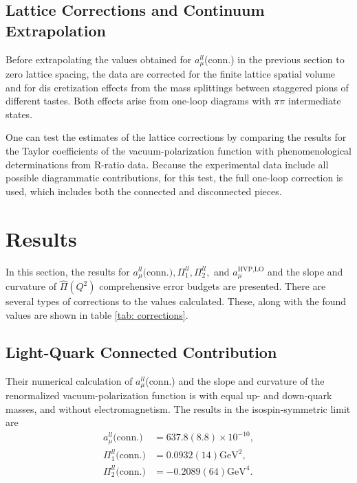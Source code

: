 \documentclass[
a4paper,
10pt,
twoside,
prd,
aps,
nofootinbib,
superscriptaddress,
floatfix,
preprintnumbers,
]{article}
\begin{document}
\subsection{Lattice Corrections and Continuum Extrapolation}
\label{sec: LatCalcC}

Before extrapolating the values obtained for $a_\mu^{ll}$(conn.) in the previous section to zero lattice spacing, the data are corrected for the finite lattice spatial volume and for dis cretization effects from the mass splittings between staggered pions of different tastes.
Both effects arise from one-loop diagrams with $\pi\pi$ intermediate states.

One can test the estimates of the lattice corrections by comparing the results for the Taylor coefficients of the vacuum-polarization function with phenomenological determinations from R-ratio data.
Because the experimental data include all possible diagrammatic contributions, for this test, the full one-loop correction is used, which includes both the connected and disconnected pieces.

\section{Results}
\label{sec: Results}
In this section, the results for $a_\mu^{ll}\text{(conn.)}, \Pi_1^{ll} , \Pi_2^{ll} ,$ and $a_\mu^{\text{HVP,LO}}$ and the slope and curvature of $\hat{\Pi}(Q^2)$ comprehensive error budgets are presented.
There are several types of corrections to the values calculated.
These, along with the found values are shown in table \ref{tab: corrections}.


\subsection{Light-Quark Connected Contribution}

Their numerical calculation of $a_\mu^{ll}$(conn.) and the slope and curvature of the renormalized vacuum-polarization function is with equal up- and down-quark masses, and without electromagnetism.
The results in the isospin-symmetric limit are
\begin{align}
	a_\mu^{ll} \text{(conn.)} &= 637.8(8.8) \times 10^{-10},\label{eq: a rez}\\
	\Pi_1^{ll} \text{(conn.)} &= 0.0932(14) \text{GeV}^2,\\
	\Pi_2^{ll} \text{(conn.)} &= -0.2089(64) \text{GeV}^4.
\end{align}
\end{document}
